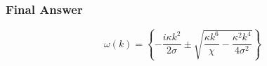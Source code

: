 \subsubsection*{Final Answer}

\[
\boxed{
\omega(k)=
\left\{
-\frac{i\kappa k^2}{2\sigma}
\pm\sqrt{\frac{\kappa k^6}{\chi}
-\frac{\kappa^2k^4}{4\sigma^2}}
\right\}
}
\]
